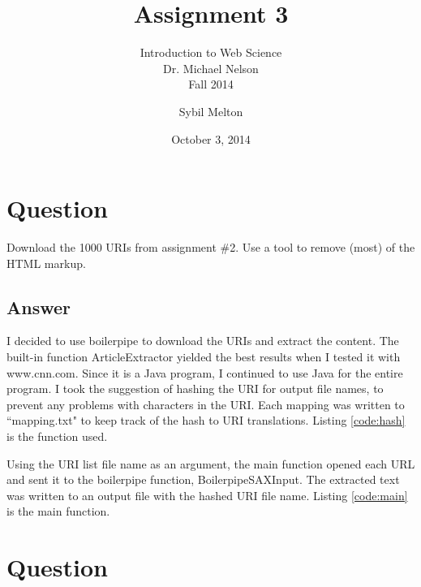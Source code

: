 \documentclass[12pt]{scrartcl} %
\begin{document}
\begin{center}
\title{\Huge \textsc Assignment 3}
\subtitle{\large \textsc Introduction to Web Science\\Dr. Michael Nelson\\Fall 2014}
\author{Sybil Melton}
\date{\small \textsc October 3, 2014}
\maketitle
\end{center}
\newpage
\tableofcontents
\listoftables
\lstlistoflistings

\newpage
{}
\section{Question}

Download the 1000 URIs from assignment \#2.
Use a tool to remove (most) of the HTML markup.

\subsection{Answer}
I decided to use boilerpipe to download the URIs and extract the content.
The built-in function ArticleExtractor yielded the best results when I tested it with www.cnn.com.
Since it is a Java program, I continued to use Java for the entire program.\cite{bib-bpdemo}
I took the suggestion of hashing the URI for output file names, to prevent any problems with characters in the URI.
Each mapping was written to ``mapping.txt" to keep track of the hash to URI translations.
Listing \ref{code:hash} is the function used.\\



Using the URI list file name as an argument, the main function opened each URL and sent it to the boilerpipe function, BoilerpipeSAXInput. 
The extracted text was written to an output file with the hashed URI file name.\cite{bib-io}
Listing \ref{code:main} is the main function.\\


\newpage
\section{Question}
\end{document}

